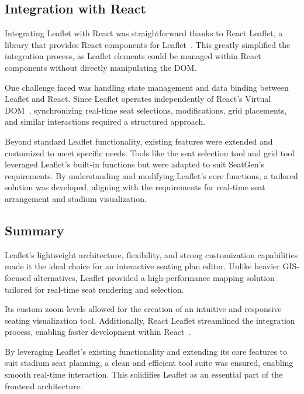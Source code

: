 \subsection{Integration with React}
Integrating Leaflet with React was straightforward thanks to React Leaflet, a library that provides React components for Leaflet~\cite{ReactLeafletDocs}. This greatly simplified the integration process, as Leaflet elements could be managed within React components without directly manipulating the DOM.

One challenge faced was handling state management and data binding between Leaflet and React. Since Leaflet operates independently of React’s Virtual DOM~\cite{ReactLeafletDocs}, synchronizing real-time seat selections, modifications, grid placements, and similar interactions required a structured approach.

Beyond standard Leaflet functionality, existing features were extended and customized to meet specific needs. Tools like the seat selection tool and grid tool leveraged Leaflet’s built-in functions but were adapted to suit SeatGen’s requirements. By understanding and modifying Leaflet’s core functions, a tailored solution was developed, aligning with the requirements for real-time seat arrangement and stadium visualization.

\subsection{Summary}

Leaflet’s lightweight architecture, flexibility, and strong customization capabilities made it the ideal choice for an interactive seating plan editor. Unlike heavier GIS-focused alternatives, Leaflet provided a high-performance mapping solution tailored for real-time seat rendering and selection. 

Its custom zoom levels allowed for the creation of an intuitive and responsive seating visualization tool. Additionally, React Leaflet streamlined the integration process, enabling faster development within React~\cite{ReactLeafletDocs}.

By leveraging Leaflet’s existing functionality and extending its core features to suit stadium seat planning, a clean and efficient tool suite was ensured, enabling smooth real-time interaction. This solidifies Leaflet as an essential part of the frontend architecture.
